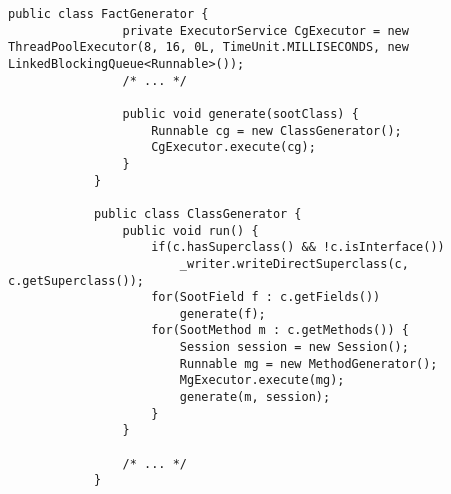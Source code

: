 \documentclass{dithesis}
\begin{document}
        \begin{lstlisting}[frame=single]
            public class FactGenerator {
                private ExecutorService CgExecutor = new ThreadPoolExecutor(8, 16, 0L, TimeUnit.MILLISECONDS, new LinkedBlockingQueue<Runnable>());
                /* ... */

                public void generate(sootClass) {
                    Runnable cg = new ClassGenerator();
                    CgExecutor.execute(cg);
                }
            }

            public class ClassGenerator {
                public void run() {
                    if(c.hasSuperclass() && !c.isInterface())
                        _writer.writeDirectSuperclass(c, c.getSuperclass());
                    for(SootField f : c.getFields())
                        generate(f);
                    for(SootMethod m : c.getMethods()) {
                        Session session = new Session();
                        Runnable mg = new MethodGenerator();
                        MgExecutor.execute(mg);
                        generate(m, session);
                    }
                }

                /* ... */
            }
        \end{lstlisting}
\end{document}
